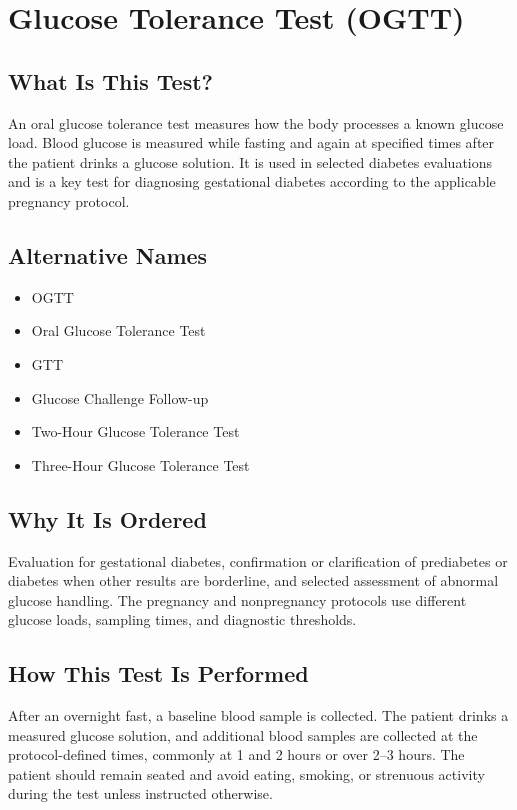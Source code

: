\chapter{Glucose Tolerance Test (OGTT)}

\section*{What Is This Test?}
An oral glucose tolerance test measures how the body processes a known glucose load. Blood glucose is measured while fasting and again at specified times after the patient drinks a glucose solution. It is used in selected diabetes evaluations and is a key test for diagnosing gestational diabetes according to the applicable pregnancy protocol.

\section*{Alternative Names}
\begin{itemize}
  \item OGTT
  \item Oral Glucose Tolerance Test
  \item GTT
  \item Glucose Challenge Follow-up
  \item Two-Hour Glucose Tolerance Test
  \item Three-Hour Glucose Tolerance Test
\end{itemize}
\section*{Why It Is Ordered}
Evaluation for gestational diabetes, confirmation or clarification of prediabetes or diabetes when other results are borderline, and selected assessment of abnormal glucose handling. The pregnancy and nonpregnancy protocols use different glucose loads, sampling times, and diagnostic thresholds.

\section*{How This Test Is Performed}
After an overnight fast, a baseline blood sample is collected. The patient drinks a measured glucose solution, and additional blood samples are collected at the protocol-defined times, commonly at 1 and 2 hours or over 2--3 hours. The patient should remain seated and avoid eating, smoking, or strenuous activity during the test unless instructed otherwise.

